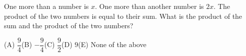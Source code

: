 One more than a number is $x$. One more than another number is $2x$. The product of the two numbers is equal to their sum. What is the product of the sum and the product of the two numbers?

(A) $\dfrac{9}{4}$\qquad (B) $-\dfrac{9}{4}$\qquad (C) $\dfrac{9}{2}$\qquad (D) $9$\qquad (E) None of the above
